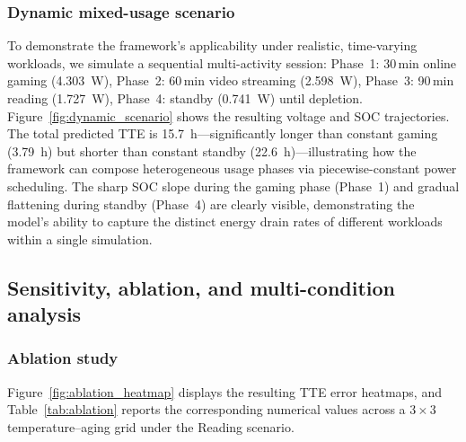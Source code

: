 \documentclass[5p,times,number]{elsarticle}
\newcommand{\figref}[1]{\textcolor{supercolor}{Figure~\ref{#1}}}
\newcommand{\tabref}[1]{\textcolor{supercolor}{Table~\ref{#1}}}
\begin{document}
\subsubsection{Dynamic mixed-usage scenario}\label{sec:dynamic}
To demonstrate the framework's applicability under realistic, time-varying workloads, we simulate a sequential multi-activity session:
Phase~1: 30\,min online gaming (\SI{4.303}{\watt}),
Phase~2: 60\,min video streaming (\SI{2.598}{\watt}),
Phase~3: 90\,min reading (\SI{1.727}{\watt}),
Phase~4: standby (\SI{0.741}{\watt}) until depletion.
\figref{fig:dynamic_scenario} shows the resulting voltage and SOC trajectories.
The total predicted TTE is \SI{15.7}{\hour}---significantly longer than constant gaming (\SI{3.79}{\hour}) but shorter than constant standby (\SI{22.6}{\hour})---illustrating how the framework can compose heterogeneous usage phases via piecewise-constant power scheduling.
The sharp SOC slope during the gaming phase (Phase~1) and gradual flattening during standby (Phase~4) are clearly visible, demonstrating the model's ability to capture the distinct energy drain rates of different workloads within a single simulation.


\subsection{Sensitivity, ablation, and multi-condition analysis}\label{sec:multi_analysis}
\subsubsection{Ablation study}\label{sec:ablation}
\figref{fig:ablation_heatmap} displays the resulting TTE error heatmaps, and \tabref{tab:ablation} reports the corresponding numerical values across a $3 \times 3$ temperature--aging grid under the Reading scenario.
\end{document}
